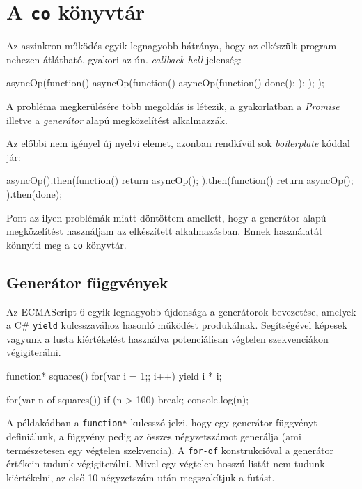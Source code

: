 \section{A \texttt{co} könyvtár}

Az aszinkron működés egyik legnagyobb hátránya, hogy az elkészült program
nehezen átlátható, gyakori az ún. \emph{callback hell} jelenség:

\begin{js}
asyncOp(function() {
  asyncOp(function() {
    asyncOp(function() {
      done();
    });
  });
});
\end{js}

A probléma megkerülésére több megoldás is létezik, a gyakorlatban a
\emph{Promise} illetve a \emph{generátor} alapú megközelítést alkalmazzák.

Az előbbi nem igényel új nyelvi elemet, azonban rendkívül sok \emph{boilerplate}
kóddal jár:

\begin{js}
asyncOp().then(function() {
  return asyncOp();
}).then(function() {
  return asyncOp();
}).then(done);
\end{js}

Pont az ilyen problémák miatt döntöttem amellett, hogy a generátor-alapú
megközelítést használjam az elkészített alkalmazásban.
Ennek használatát könnyíti meg a \verb=co= könyvtár.

\subsection{Generátor függvények}

Az ECMAScript 6 egyik legnagyobb újdonsága a generátorok bevezetése,
amelyek a C\# \verb=yield=\cite{CSYield} kulcsszavához hasonló működést
produkálnak.
Segítségével képesek vagyunk a lusta kiértékelést használva
potenciálisan végtelen szekvenciákon végigiterálni.

\begin{js}
function* squares() {
  for(var i = 1;; i++) {
    yield i * i;
  }
}

for(var n of squares()) {
  if (n > 100) {
    break;
  }
  console.log(n);
}
\end{js}

A példakódban a \verb=function*= kulcsszó jelzi, hogy egy generátor függvényt
definiálunk, a függvény pedig az összes négyzetszámot generálja
(ami természetesen egy végtelen szekvencia). A \verb=for-of= konstrukcióval
a generátor értékein tudunk végigiterálni.
Mivel egy végtelen hosszú listát nem tudunk kiértékelni, az első 10
négyzetszám után megszakítjuk a futást.

